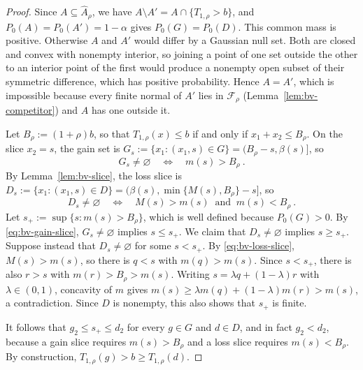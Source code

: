 \documentclass[11pt]{article}
\numberwithin{equation}{section}
\theoremstyle{definition}
\begin{document}
\begin{proof}
Since $A\subseteq\widehat A_\rho$, we have $A\setminus A'=A\cap\{T_{1,\rho}>b\}$, and $P_0(A)=P_0(A')=1-\alpha$ gives $P_0(G)=P_0(D)$. This common mass is positive. Otherwise $A$ and $A'$ would differ by a Gaussian null set. Both are closed and convex with nonempty interior, so joining a point of one set outside the other to an interior point of the first would produce a nonempty open subset of their symmetric difference, which has positive probability. Hence $A=A'$, which is impossible because every finite normal of $A'$ lies in $\mathcal F_\rho$ (Lemma~\ref{lem:bv-competitor}) and $A$ has one outside it.

Let $B_\rho:=(1+\rho)b$, so that $T_{1,\rho}(x)\le b$ if and only if $x_1+x_2\le B_\rho$. On the slice $x_2=s$, the gain set is $G_s:=\{x_1:(x_1,s)\in G\}=(B_\rho-s,\beta(s)]$, so
\begin{equation}\label{eq:bv-gain-slice}
G_s\ne\varnothing
\quad\Longleftrightarrow\quad
m(s)>B_\rho~.
\end{equation}
By Lemma~\ref{lem:bv-slice}, the loss slice is $D_s:=\{x_1:(x_1,s)\in D\}=(\beta(s),\min\{M(s),B_\rho\}-s]$, so
\begin{equation}\label{eq:bv-loss-slice}
D_s\ne\varnothing
\quad\Longleftrightarrow\quad
M(s)>m(s)\ \text{ and }\ m(s)<B_\rho~.
\end{equation}
Let $s_+:=\sup\{s:m(s)>B_\rho\}$, which is well defined because $P_0(G)>0$. By \eqref{eq:bv-gain-slice}, $G_s\ne\varnothing$ implies $s\le s_+$. We claim that $D_s\ne\varnothing$ implies $s\ge s_+$. Suppose instead that $D_s\ne\varnothing$ for some $s<s_+$. By \eqref{eq:bv-loss-slice}, $M(s)>m(s)$, so there is $q<s$ with $m(q)>m(s)$. Since $s<s_+$, there is also $r>s$ with $m(r)>B_\rho>m(s)$. Writing $s=\lambda q+(1-\lambda)r$ with $\lambda\in(0,1)$, concavity of $m$ gives $m(s)\ge\lambda m(q)+(1-\lambda)m(r)>m(s)$, a contradiction. Since $D$ is nonempty, this also shows that $s_+$ is finite.

It follows that $g_2\le s_+\le d_2$ for every $g\in G$ and $d\in D$, and in fact $g_2<d_2$, because a gain slice requires $m(s)>B_\rho$ and a loss slice requires $m(s)<B_\rho$. By construction, $T_{1,\rho}(g)>b\ge T_{1,\rho}(d)$.


\end{proof}
\end{document}
